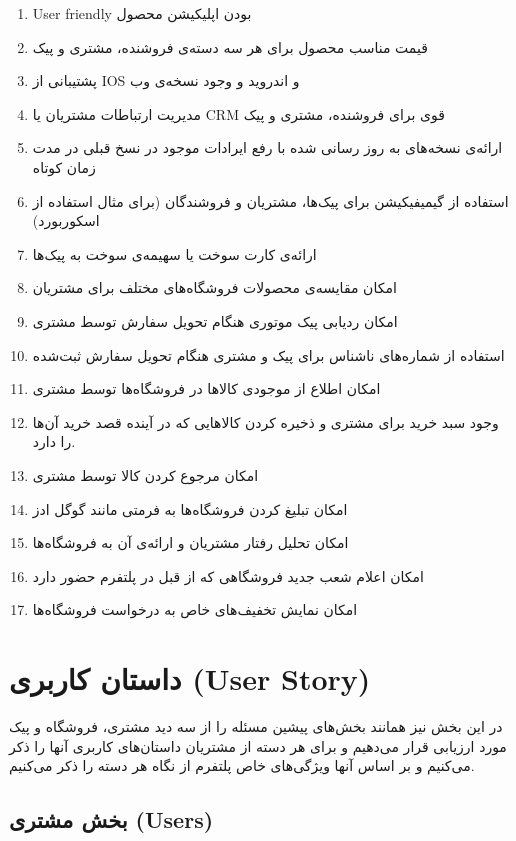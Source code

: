 \documentclass[]{article}
\begin{document}
\begin{enumerate}
\def\labelenumi{\arabic{enumi})}
\item
  User friendly بودن اپلیکیشن محصول
\item
  قیمت مناسب محصول برای هر سه دسته‌ی فروشنده، مشتری و پیک
\item
  پشتیبانی از IOS و اندروید و وجود نسخه‌ی وب
\item
  مدیریت ارتباطات مشتریان یا CRM قوی برای فروشنده، مشتری و پیک
\item
  ارائه‌ی نسخه‌های به روز رسانی شده با رفع ایرادات موجود در نسخ قبلی در
  مدت زمان کوتاه
\item
  استفاده از گیمیفیکیشن برای پیک‌ها، مشتریان و فروشندگان (برای مثال
  استفاده از اسکوربورد)
\item
  ارائه‌ی کارت سوخت یا سهیمه‌ی سوخت به پیک‌ها
\item
  امکان مقایسه‌ی محصولات فروشگاه‌های مختلف برای مشتریان
\item
  امکان ردیابی پیک موتوری هنگام تحویل سفارش توسط مشتری
\item
  استفاده از شماره‌های ناشناس برای پیک و مشتری هنگام تحویل سفارش ثبت‌شده
\item
  امکان اطلاع از موجودی کالاها در فروشگاه‌ها توسط مشتری
\item
  وجود سبد خرید برای مشتری و ذخیره کردن کالاهایی که در آینده قصد خرید
  آن‌ها را دارد.
\item
  امکان مرجوع کردن کالا توسط مشتری
\item
  امکان تبلیغ کردن فروشگاه‌ها به فرمتی مانند گوگل ادز
\item
  امکان تحلیل رفتار مشتریان و ارائه‌ی آن به فروشگاه‌ها
\item
  امکان اعلام شعب جدید فروشگاهی که از قبل در پلتفرم حضور دارد
\item
  امکان نمایش تخفیف‌های خاص به درخواست فروشگاه‌ها
\end{enumerate}

\section{داستان کاربری (User
Story)}\label{ux62fux627ux633ux62aux627ux646-ux6a9ux627ux631ux628ux631ux6cc-user-story}

در این بخش نیز همانند بخش‌های پیشین مسئله را از سه دید مشتری، فروشگاه و
پیک مورد ارزیابی قرار می‌دهیم و برای هر دسته از مشتریان داستان‌های
کاربری آنها را ذکر می‌کنیم و بر اساس آنها ویژگی‌های خاص پلتفرم از نگاه
هر دسته را ذکر می‌کنیم.

\subsection{بخش مشتری
(Users)}\label{ux628ux62eux634-ux645ux634ux62aux631ux6cc-users-1}
\end{document}
